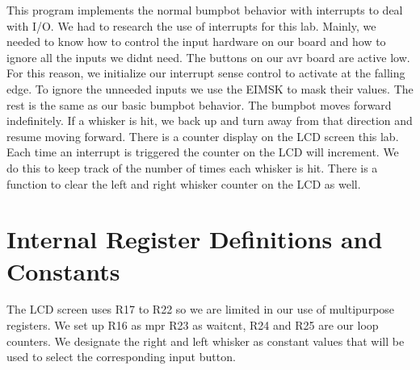 \documentclass[12pt, letterpaper]{article}
\begin{document}
This program implements the normal bumpbot behavior with interrupts to deal with I/O. We had to research the use of interrupts for this lab. Mainly, we needed to know how to control the input hardware on our board and how to ignore all the inputs we didnt need. The buttons on our avr board are active low. For this reason, we initialize our interrupt sense control to activate at the falling edge. To ignore the unneeded inputs we use the EIMSK to mask their values. The rest is the same as our basic bumpbot behavior. The bumpbot moves forward indefinitely. If a whisker is hit, we back up and turn away from that direction and resume moving forward. There is a counter display on the LCD screen this lab. Each time an interrupt is triggered the counter on the LCD will increment. We do this to keep track of the number of times each whisker is hit. There is a function to clear the left and right whisker counter on the LCD as well.


\section{Internal Register Definitions and Constants}
 The LCD screen uses R17 to R22 so we are limited in our use of multipurpose registers. We set up R16 as mpr R23 as waitcnt, R24 and R25 are our loop counters. We designate the right and left whisker as constant values that will be used to select the corresponding input button. 

\end{document}
